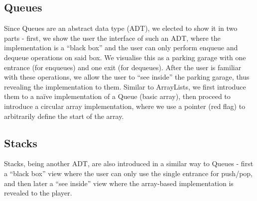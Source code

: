 \documentclass[10pt]{article}
\begin{document}
\subsection{Queues}
Since Queues are an abstract data type (ADT), we elected to show it in two parts - first, we show the user the interface of such an ADT, where the implementation is a ``black box'' and the user can only perform enqueue and dequeue operations on said box. We visualise this as a parking garage with one entrance (for enqueues) and one exit (for dequeues). After the user is familiar with these operations, we allow the user to ``see inside'' the parking garage, thus revealing the implementation to them. Similar to ArrayLists, we first introduce them to a naïve implementation of a Queue (basic array), then proceed to introduce a circular array implementation, where we use a pointer (red flag) to arbitrarily define the start of the array.
\subsection{Stacks}
Stacks, being another ADT, are also introduced in a similar way to Queues - first a ``black box'' view where the user can only use the single entrance for push/pop, and then later a ``see inside'' view where the array-based implementation is revealed to the player.
\end{document}
